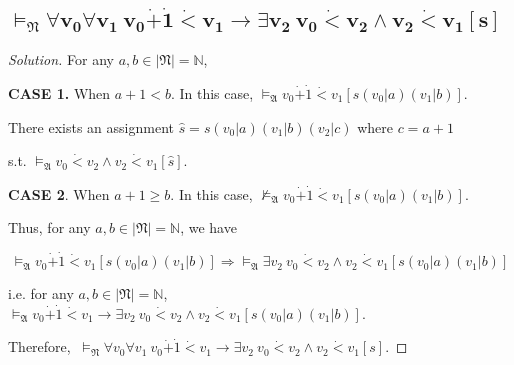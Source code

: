 \documentclass{article}
\newenvironment{solution}{\begin{proof}[\noindent\it Solution]}{\end{proof}}
\begin{document}
\subsection{$\boldsymbol{\vDash_{\mathfrak{N}}\forall v_0\forall v_1 \ v_0\dot{+}\dot{1}\dot{<}v_1 \to \exists v_2\ v_0\dot{<}v_2 \land v_2\dot{<}v_1[s]}$}
\vspace{1em}
\begin{solution}
    For any $a,b\in|\mathfrak{N}|=\mathbb{N}$, 
    
    \hspace{2.6em}
    \textbf{CASE 1.} When $a+1<b$. In this case, $\vDash_\mathfrak{A} v_0\dot{+}\dot{1}\dot{<}v_1[s(v_0|a)(v_1|b)]$.
    
    \hspace{7.4em}
    There exists an assignment $\hat{s}=s(v_0|a)(v_1|b)(v_2|c)$ where $c=a+1$
    
    \hspace{17.8em}
    s.t. $\vDash_\mathfrak{A}v_0\dot{<}v_2\land v_2\dot{<}v_1[\hat{s}]$.

    \hspace{2.6em}
    \textbf{CASE 2}. When $a+1\geq b$. In this case, $\nvDash_\mathfrak{A} v_0\dot{+}\dot{1}\dot{<}v_1 [s(v_0|a)(v_1|b)]$.

    \vspace{1em} \hspace{2.6em}
    Thus, for any $a,b\in|\mathfrak{N}|=\mathbb{N}$, we have 
    
    \vspace{-1.8em}
    $$\vDash_\mathfrak{A} v_0\dot{+}\dot{1}\dot{<}v_1 [s(v_0|a)(v_1|b)] \Longrightarrow \vDash_\mathfrak{A}\exists v_2\ v_0\dot{<}v_2 \land v_2\dot{<}v_1 [s(v_0|a)(v_1|b)]$$

    \vspace{-0.75em} \hspace{2.6em}
    i.e. for any $a,b\in|\mathfrak{N}|=\mathbb{N}$, $\vDash_\mathfrak{A} v_0\dot{+}\dot{1}\dot{<}v_1 \to \exists v_2\ v_0\dot{<}v_2 \land v_2\dot{<}v_1 [s(v_0|a)(v_1|b)]$.

    \vspace{1em} \hspace{2.6em}
    Therefore, $\ \vDash_{\mathfrak{N}}\forall v_0\forall v_1 \ v_0\dot{+}\dot{1}\dot{<}v_1 \to \exists v_2\ v_0\dot{<}v_2 \land v_2\dot{<}v_1[s].$
\end{solution}

\vspace{1em}
\end{document}
